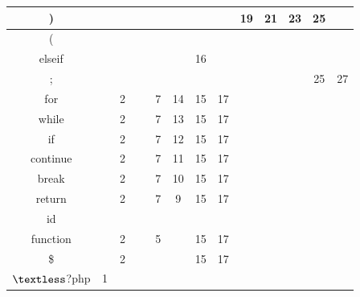 \documentclass[12pt,a4paper,titlepage,final]{article}
\begin{document}
\begin{landscape}
\begin{table}
\begin{small}
\begin{tabular}{|c|c|c|c|c|c|c|c|c|c|c|c|c|}
    )        & ~    & ~    & ~    & ~         & ~    & ~           & ~         & 19         & 21          & 23      & 25        & ~         \\ \hline
    (        & ~    & ~    & ~    & ~         & ~    & ~           & ~         & ~          & ~           & ~       & ~         & ~         \\ \hline
    elseif   & ~    & ~    & ~    & ~         & ~    & 16          & ~         & ~          & ~           & ~       & ~         & ~         \\ \hline
    ;       & ~    & ~    & ~    & ~         & ~    & ~           & ~         & ~          & ~           & ~       & 25        & 27        \\ \hline
    for      & ~    & 2    & ~    & 7         & 14   & 15          & 17        & ~          & ~           & ~       & ~         & ~         \\ \hline
    while    & ~    & 2    & ~    & 7         & 13   & 15          & 17        & ~          & ~           & ~       & ~         & ~         \\ \hline
    if       & ~    & 2    & ~    & 7         & 12   & 15          & 17        & ~          & ~           & ~       & ~         & ~         \\ \hline
    continue & ~    & 2    & ~    & 7         & 11   & 15          & 17        & ~          & ~           & ~       & ~         & ~         \\ \hline
    break    & ~    & 2    & ~    & 7         & 10   & 15          & 17        & ~          & ~           & ~       & ~         & ~         \\ \hline
    return   & ~    & 2    & ~    & 7         & 9    & 15          & 17        & ~          & ~           & ~       & ~         & ~         \\ \hline
    id       & ~    & ~    & ~    & ~         & ~    & ~           & ~         & ~          & ~           & ~       & ~         & ~         \\ \hline
    function & ~    & 2    & ~    & 5         & ~    & 15          & 17        & ~          & ~           & ~       & ~         & ~         \\ \hline
    \$      & ~    & 2    & ~    & ~         & ~    & 15          & 17        & ~          & ~           & ~       & ~         & ~         \\ \hline
    $\textless$?php      & 1    & ~    & ~    & ~         & ~    & ~           & ~         & ~          & ~           & ~       & ~         & ~         \\ \hline
    \end{tabular}
    \end{small}
\end{table}
    \end{landscape}
    \clearpage%
\newpage
\end{document}

